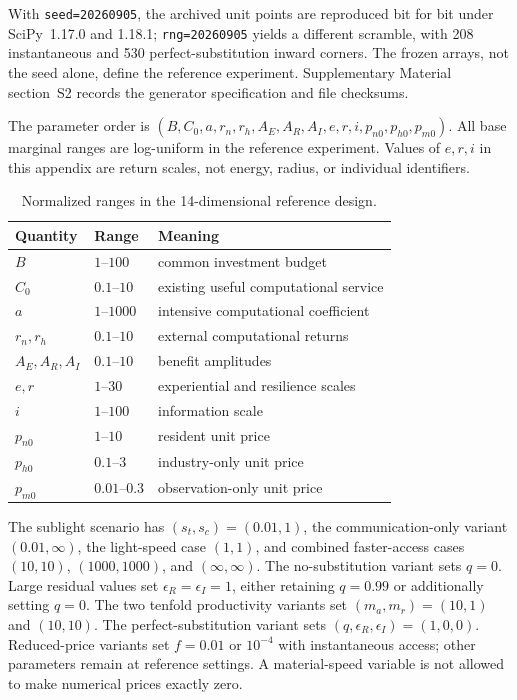 \documentclass[11pt,a4paper]{article}
\theoremstyle{definition}\newtheorem{definition}{Definition}
\begin{document}
With \texttt{seed=20260905}, the archived unit points are reproduced
bit for bit under SciPy~1.17.0 and 1.18.1;
\texttt{rng=20260905} yields a different scramble, with 208
instantaneous and 530 perfect-substitution inward corners.
The frozen arrays, not the seed alone, define the reference experiment.
Supplementary Material section~S2 records the generator specification
and file checksums.

The parameter order is $(B,C_0,a,r_n,r_h,A_E,A_R,A_I,e,r,i,p_{n0},p_{h0},p_{m0})$. All base marginal ranges are log-uniform in the reference experiment. Values of $e,r,i$ in this appendix are return scales, not energy, radius, or individual identifiers.

\begin{table}[htbp]
\centering
\caption{Normalized ranges in the 14-dimensional reference design.}
\label{tab:ranges}
\begin{tabular}{@{}lll@{}}
\toprule
Quantity & Range & Meaning\\
\midrule
$B$ & $1$--$100$ & common investment budget\\
$C_0$ & $0.1$--$10$ & existing useful computational service\\
$a$ & $1$--$1000$ & intensive computational coefficient\\
$r_n,r_h$ & $0.1$--$10$ & external computational returns\\
$A_E,A_R,A_I$ & $0.1$--$10$ & benefit amplitudes\\
$e,r$ & $1$--$30$ & experiential and resilience scales\\
$i$ & $1$--$100$ & information scale\\
$p_{n0}$ & $1$--$10$ & resident unit price\\
$p_{h0}$ & $0.1$--$3$ & industry-only unit price\\
$p_{m0}$ & $0.01$--$0.3$ & observation-only unit price\\
\bottomrule
\end{tabular}
\end{table}

The sublight scenario has $(s_t,s_c)=(0.01,1)$, the communication-only variant $(0.01,\infty)$, the light-speed case $(1,1)$, and combined faster-access cases $(10,10)$, $(1000,1000)$, and $(\infty,\infty)$. The no-substitution variant sets $q=0$. Large residual values set $\epsilon_R=\epsilon_I=1$, either retaining $q=0.99$ or additionally setting $q=0$. The two tenfold productivity variants set $(m_a,m_r)=(10,1)$ and $(10,10)$. The perfect-substitution variant sets $(q,\epsilon_R,\epsilon_I)=(1,0,0)$. Reduced-price variants set $f=0.01$ or $10^{-4}$ with instantaneous access; other parameters remain at reference settings. A material-speed variable is not allowed to make numerical prices exactly zero.
\end{document}
